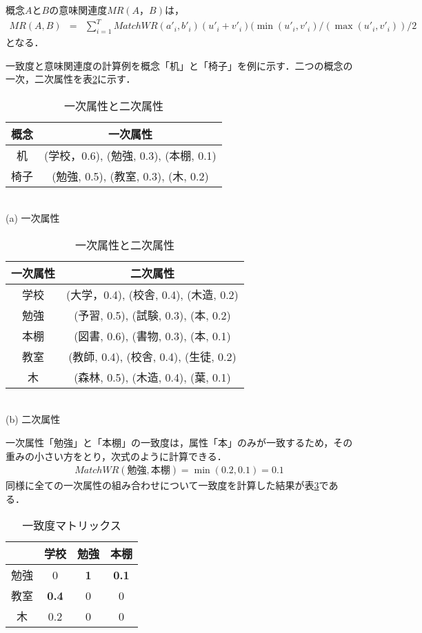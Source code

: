 概念$A$と$B$の意味関連度$MR(A，B)$は，
\begin{eqnarray}
MR(A,B) &=& \sum_{i=1}^{T} MatchWR(a'_i,b'_{i})(u'_i+v'_{i})(\min(u'_i,v'_{i})/(\max(u'_i,v'_{i}))/2  \label{EMR}
\end{eqnarray}
となる．

一致度と意味関連度の計算例を概念「机」と「椅子」を例に示す．二つの概念の一次，二次属性を表\ref{T3}に示す．

\begin{table}[htb]
\caption[]{一次属性と二次属性}
\label{T3}
\begin{center}
\begin{tabular}{|c|c|} \hline
概念 & 一次属性 \\ \hline
机   & (学校，0.6), (勉強, 0.3), (本棚, 0.1) \\ \hline
椅子 & (勉強, 0.5), (教室, 0.3), (木, 0.2) \\ \hline
\end{tabular}
\\ (a) 一次属性 \\
\end{center}
\begin{center}
\begin{tabular}{|c|c|} \hline
一次属性 & 二次属性 \\ \hline
学校     & (大学，0.4), (校舎, 0.4), (木造, 0.2) \\ \hline
勉強     & (予習, 0.5), (試験, 0.3), (本, 0.2)   \\ \hline
本棚     & (図書, 0.6), (書物, 0.3), (本, 0.1)   \\ \hline
教室     & (教師, 0.4), (校舎, 0.4), (生徒, 0.2) \\ \hline
木       & (森林, 0.5), (木造, 0.4), (葉, 0.1)   \\ \hline
\end{tabular}
\\ (b) 二次属性
\end{center}
\end{table}

一次属性「勉強」と「本棚」の一致度は，属性「本」のみが一致するため，その重みの小さい方をとり，次式のように計算できる．
\begin{eqnarray}
MatchWR(勉強,本棚)=\min(0.2,0.1)=0.1
\end{eqnarray}
同様に全ての一次属性の組み合わせについて一致度を計算した結果が表\ref{T5}である．

\begin{table}[tb]
\caption[]{一致度マトリックス}
\label{T5}
\begin{center}
\begin{tabular}{|c|c|c|c|} \hline
     & 学校      & 勉強    & 本棚       \\ \hline
勉強 & 0         & {\bf 1} & {\bf 0.1}  \\ \hline
教室 & {\bf 0.4} & 0       & 0          \\ \hline
木   & 0.2       & 0       & 0          \\ \hline
\end{tabular}
\end{center}
\end{table}

